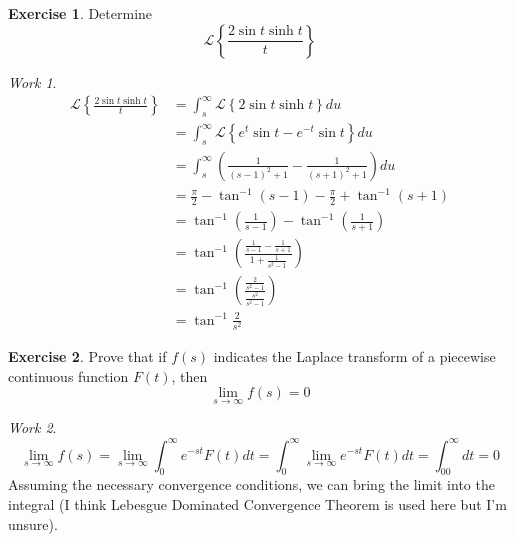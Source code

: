 \documentclass{report}
\theoremstyle{definition}
\newtheorem{exercise}{Exercise}[chapter]
\theoremstyle{remark}
\newtheorem*{work}{Work}
\newcommand{\lapt}[1]{\mathscr{L}\left\{ #1\right\}}
\begin{document}
\begin{exercise}
    Determine 
    \begin{equation*}
        \lapt{\frac{2\sin t \sinh t}{t}}
    \end{equation*}
\end{exercise}
\begin{work}
    \begin{equation*}
        \begin{split}
            \lapt{\frac{2\sin t \sinh t}{t}} &= \int^\infty_s \lapt{2\sin t \sinh t}du\\
            &=\int^\infty_s \lapt{e^t\sin t-e^{-t}\sin t}du \\
            &= \int^\infty_s\left(\frac{1}{(s-1)^2+1} - \frac{1}{(s+1)^2+1} \right)du \\
            &= \frac{\pi}{2}-\tan^{-1}(s-1) - \frac{\pi}{2}+\tan^{-1}(s+1) \\
            &=\tan^{-1}\left( \frac{1}{s-1} \right) - \tan^{-1}\left( \frac{1}{s+1} \right)\\
            &= \tan^{-1} \left( \frac{\frac{1}{s-1}-\frac{1}{s+1}}{1+\frac{1}{s^2-1}} \right) \\
            &= \tan^{-1}\left( \frac{\frac{2}{s^2-1}}{\frac{s^2}{s^2-1}} \right) \\
            &= \tan^{-1}\frac{2}{s^2}
        \end{split}
    \end{equation*}
\end{work}

\begin{exercise}
    Prove that if $f(s)$ indicates the Laplace transform of a piecewise continuous function $F(t)$, then 
    \begin{equation*}
        \lim_{s\rightarrow \infty} f(s)=0
    \end{equation*}
\end{exercise}
\begin{work}
    \begin{equation*}
        \lim_{s\rightarrow \infty} f(s)= \lim_{s\rightarrow \infty} \int^\infty_0e^{-st}F(t)dt = \int^\infty_0\lim_{s\rightarrow \infty} e^{-st}F(t)dt =\int^\infty_00dt =0
    \end{equation*}
    Assuming the necessary convergence conditions, we can bring the limit into the integral (I think Lebesgue Dominated Convergence Theorem is used here but I'm unsure).
\end{work}
\end{document}
